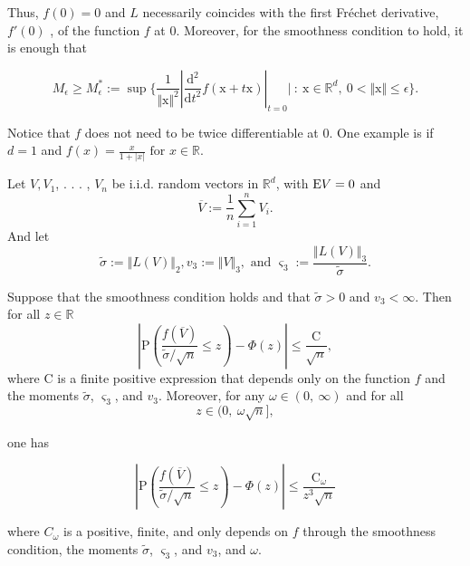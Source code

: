 Thus, $f(0)=0$ and $L$ necessarily coincides with the first Fr\'{e}chet derivative, $f'(0)$ , of the function $f$ at $0$. Moreover, for the smoothness condition to hold, it is enough that 

\[
M_{\epsilon}\geq M_{\epsilon}^{*} :=\displaystyle \sup\{\frac{1}{\Vert \mathrm{x}\Vert^{2}}|\frac{\mathrm{d}^{2}}{\mathrm{d}t^{2}}f(\mathrm{x}+t\mathrm{x})|_{t=0}|\ :\ \mathrm{x}\in \mathbb{R}^{d},\ 0<\Vert \mathrm{x}\Vert\leq\epsilon\}.
\]

Notice that $f$ does not need to be twice differentiable at $0$. One example is if $d=1$ and $f(x)= \displaystyle \frac{x}{1+|x|} \textrm{ for } x\in \mathbb{R}.$


Let $V, V_{1}$, . . . , $V_{n}$ be i.i.d. random vectors in $\mathbb{R}^{d}$, with $\mathrm{E} V=0$ and
$$
\overline{V}:=\frac{1}{n}\sum_{i=1}^{n}V_{i}.
$$
And let
\begin{equation}\label{sigmatilde}
\tilde{\sigma} :=\Vert L(V)\Vert_{2}, v_{3} :=\Vert V\Vert_{3}, \textrm{ and } \varsigma_{3} :=\displaystyle \frac{\Vert L(V)\Vert_{3}}{\tilde{\sigma}}.
\end{equation}

\begin{theorem}\label{berryesseen}
	Suppose that the smoothness condition holds and that $\tilde{\sigma}>0$ and $v_{3}<\infty$. Then for all $z\in \mathbb{R}$
	\begin{equation}\label{berryesseen1}
	|\displaystyle \mathrm{P}(\frac{f(\overline{V})}{\tilde{\sigma}/\sqrt{n}}\leq z)-\Phi(z)|\leq\frac{\mathrm{C}}{\sqrt{n}},
	\end{equation}
	where $\mathrm{C}$ is a finite positive expression that depends only on the function $f$ and the moments $\tilde{\sigma}$, $\varsigma_{3}$, and $v_{3}$. Moreover, for any $\omega\in(0,\ \infty)$ and for all
	\begin{equation}\label{omega}
	z\in(0,\ \omega\sqrt{n}],
	\end{equation}
	
	one has
	
	\begin{equation}\label{berryesseen2}
	|\mathrm{P}(\frac{f(\overline{V})}{\tilde{\sigma}/\sqrt{n}}\leq z)-\Phi(z)|\leq\frac{\mathrm{C}_{\omega}}{z^{3}\sqrt{n}}
	\end{equation}
	
	where $C_{\omega}$ is a positive, finite, and only depends on $f$ through the smoothness condition, the moments $\tilde{\sigma}$, $\varsigma_{3}$, and $v_3$, and $\omega$.
\end{theorem}

